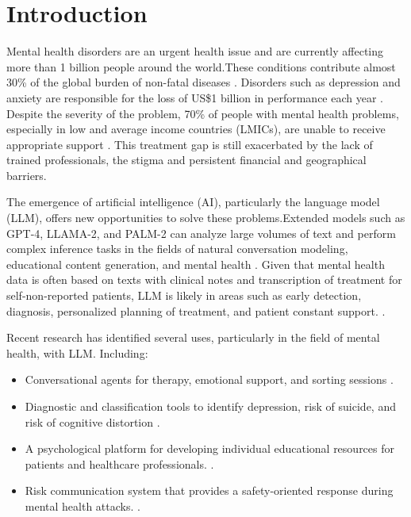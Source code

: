 \documentclass[sn-basic,authoryear]{sn-jnl}
\begin{document}
\maketitle
\section{Introduction}
Mental health disorders are an urgent health issue and are currently affecting more than 1 billion people around the world.These conditions contribute almost 30\% of the global burden of non-fatal diseases  \cite{WHO2022}. Disorders such as depression and anxiety are responsible for the loss of US\$1 billion in performance each year \cite{Volkmer}. Despite the severity of the problem, 70\% of people with mental health problems, especially in low and average income countries (LMICs), are unable to receive appropriate support \cite{Naslund2017}. This treatment gap is still exacerbated by the lack of trained professionals, the stigma and persistent financial and geographical barriers.

The emergence of artificial intelligence (AI), particularly the language model (LLM), offers new opportunities to solve these problems.Extended models such as GPT-4, LLAMA-2, and PALM-2 can analyze large volumes of text and perform complex inference tasks in the fields of natural conversation modeling, educational content generation, and mental health \cite{Hua2024b,JMIR2024}. Given that mental health data is often based on texts with clinical notes and transcription of treatment for self-non-reported patients, LLM is likely in areas such as early detection, diagnosis, personalized planning of treatment, and patient constant support. \cite{Ibrahimov2024,Olawade2024}.

Recent research has identified several uses, particularly in the field of mental health, with LLM. Including:
\begin{itemize}
    \item Conversational agents for therapy, emotional support, and sorting sessions  \cite{Ma2023,Hu2025}.
    \item Diagnostic and classification tools to identify depression, risk of suicide, and risk of cognitive distortion  \cite{Xu2024,Yang2024}.
    \item A psychological platform for developing individual educational resources for patients and healthcare professionals. \cite{Khandelwal, Goebel}.
    \item Risk communication system that provides a safety-oriented response during mental health attacks. \cite{Hua2024b}.
\end{itemize}
\end{document}
